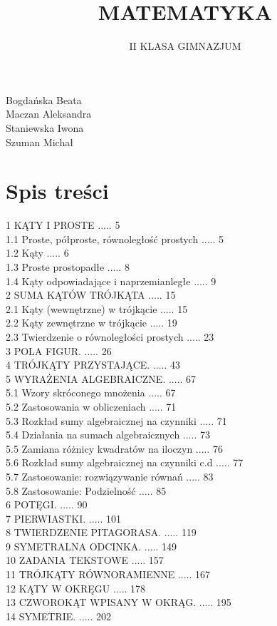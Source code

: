 \documentclass[10pt]{article}
\title{MATEMATYKA }
\author{II KLASA GIMNAZJUM}
\date{}
\begin{document}
\maketitle
Bogdańska Beata\\
Maczan Aleksandra\\
Staniewska Iwona\\
Szuman Michał

\section*{Spis treści}
1 KĄTY I PROSTE ..... 5\\
1.1 Proste, półproste, równoległość prostych ..... 5\\
1.2 Kąty ..... 6\\
1.3 Proste prostopadłe ..... 8\\
1.4 Kąty odpowiadające i naprzemianległe ..... 9\\
2 SUMA KĄTÓW TRÓJKĄTA ..... 15\\
2.1 Kąty (wewnętrzne) w trójkącie ..... 15\\
2.2 Kąty zewnętrzne w trójkącie ..... 19\\
2.3 Twierdzenie o równoległości prostych ..... 23\\
3 POLA FIGUR. ..... 26\\
4 TRÓJKĄTY PRZYSTAJĄCE. ..... 43\\
5 WYRAŻENIA ALGEBRAICZNE. ..... 67\\
5.1 Wzory skróconego mnożenia ..... 67\\
5.2 Zastosowania w obliczeniach ..... 71\\
5.3 Rozkład sumy algebraicznej na czynniki ..... 71\\
5.4 Działania na sumach algebraicznych ..... 73\\
5.5 Zamiana różnicy kwadratów na iloczyn ..... 76\\
5.6 Rozkład sumy algebraicznej na czynniki c.d ..... 77\\
5.7 Zastosowanie: rozwiązywanie równań ..... 83\\
5.8 Zastosowanie: Podzielność ..... 85\\
6 POTĘGI. ..... 90\\
7 PIERWIASTKI. ..... 101\\
8 TWIERDZENIE PITAGORASA. ..... 119\\
9 SYMETRALNA ODCINKA. ..... 149\\
10 ZADANIA TEKSTOWE ..... 157\\
11 TRÓJKĄTY RÓWNORAMIENNE ..... 167\\
12 KĄTY W OKRĘGU ..... 178\\
13 CZWOROKĄT WPISANY W OKRĄG. ..... 195\\
14 SYMETRIE. ..... 202
\end{document}
